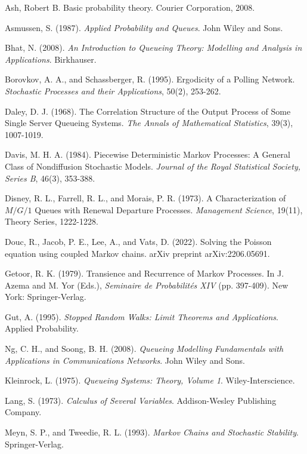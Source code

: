 \begin{thebibliography}{99}
 Ash, Robert B. Basic probability theory. Courier Corporation, 2008.

 Asmussen, S. (1987). \textit{Applied Probability and Queues}. John Wiley and Sons.

 Bhat, N. (2008). \textit{An Introduction to Queueing Theory: Modelling and Analysis in Applications}. Birkhauser.

 Borovkov, A. A., and Schassberger, R. (1995). Ergodicity of a Polling Network. \textit{Stochastic Processes and their Applications}, 50(2), 253-262.

 Daley, D. J. (1968). The Correlation Structure of the Output Process of Some Single Server Queueing Systems. \textit{The Annals of Mathematical Statistics}, 39(3), 1007-1019.

 Davis, M. H. A. (1984). Piecewise Deterministic Markov Processes: A General Class of Nondiffusion Stochastic Models. \textit{Journal of the Royal Statistical Society, Series B}, 46(3), 353-388.

 Disney, R. L., Farrell, R. L., and Morais, P. R. (1973). A Characterization of $M/G/1$ Queues with Renewal Departure Processes. \textit{Management Science}, 19(11), Theory Series, 1222-1228.

 Douc, R., Jacob, P. E., Lee, A., and Vats, D. (2022). Solving the Poisson equation using coupled Markov chains. arXiv preprint arXiv:2206.05691.

 Getoor, R. K. (1979). Transience and Recurrence of Markov Processes. In J. Azema and M. Yor (Eds.), \textit{Seminaire de Probabilités XIV} (pp. 397-409). New York: Springer-Verlag.

 Gut, A. (1995). \textit{Stopped Random Walks: Limit Theorems and Applications}. Applied Probability.

 Ng, C. H., and Soong, B. H. (2008). \textit{Queueing Modelling Fundamentals with Applications in Communications Networks}. John Wiley and Sons.

 Kleinrock, L. (1975). \textit{Queueing Systems: Theory, Volume 1}. Wiley-Interscience.

 Lang, S. (1973). \textit{Calculus of Several Variables}. Addison-Wesley Publishing Company.

 Meyn, S. P., and Tweedie, R. L. (1993). \textit{Markov Chains and Stochastic Stability}. Springer-Verlag.


\end{thebibliography}
